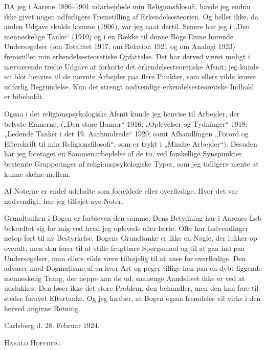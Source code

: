 \documentclass[12pt,a4paper,openany]{book}
\begin{document}
DA jeg i Aarene 1896--1901 udarbejdede min Religionsfilosofi, havde jeg
endnu ikke givet nogen udførligere Fremstilling af Erkendelsesteorien.
Og heller ikke, da anden Udgave skulde komme (1906), var jeg naat
dertil. Senere har jeg i „Den menneskelige Tanke“ (1910) og i en Række
til denne Bogs Emne hørende Undersøgelser (om Totalitet 1917, om
Relation 1921 og om Analogi 1923) fremstillet min erkendelsesteoretiske
Opfattelse. Det har derved været muligt i nærværende tredie Udgave at
forkorte det erkendelsesteoretiske Afsnit; jeg kunde nu blot henvise til
de nævnte Arbejder paa flere Punkter, som ellers vilde kræve udførlig
Begrundelse. Kun det strengt nødvendige erkendelsesteoretiske Indhold er
bibeholdt.

Ogsaa i det religionspsykologiske Afsnit kunde jeg henvise til Arbejder,
der belyste Emnerne. („Den store Humor“ 1916; „Oplevelser og Tydninger“
1918; „Ledende Tanker i det 19. Aarhundrede“ 1920; samt Afhandlingen
„Forord og Efterskrift til min Religionsfilosofi“, som er trykt i
„Mindre Arbejder“). Desuden har jeg foretaget en Sammenarbejdelse af de
to, ved forskellige Synspunkter bestemte Grupperinger af
religionspsykologiske Typer, som jeg tidligere mente at kunne skelne
mellem.

Af Noterne er endel udeladte som forældede eller overflødige. Hvor det
var nødvendigt, har jeg tilføjet nye Noter.

Grundtanken i Bogen er forbleven den samme. Dens Betydning har i Aarenes
Løb bekræftet sig for mig ved hvad jeg oplevede eller lærte. Ofte har
Indvendinger netop ført til ny Bestyrkelse. Bogens Grundtanke er ikke en
Nøgle, der lukker op overalt, men den fører til at stille frugtbare
Spørgsmaal og til at gaa ind paa Undersøgelser, man ellers vilde være
tilbøjelig til at anse for overflødige. Den advarer mod Dogmatisme af
en%
hver Art og peger tillige hen paa en dybt liggende menneskelig Trang,
der neppe kan dø ud, saalænge Aandslivet ikke er ved at udslukkes. Den
løser ikke det store Problem, den behandler, men den kan føre til stedse
fornyet Eftertanke. Og jeg haaber, at Bogen ogsaa fremdeles vil virke i
den herved angivne Retning.

Carlsberg d. 28. Februar 1924.

\textsc{Harald Høffding.}
\clearpage
\end{document}

